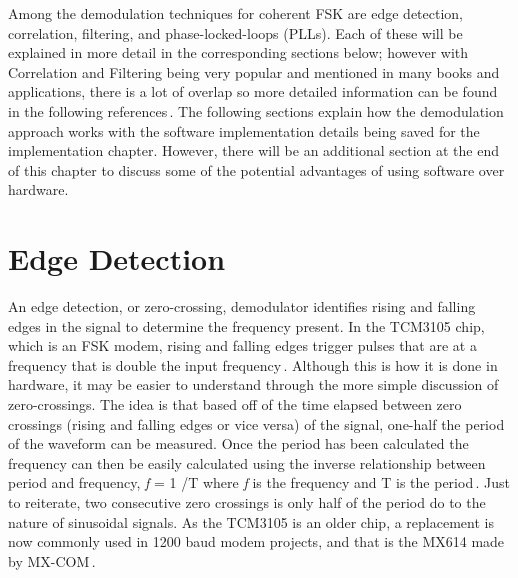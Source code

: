 Among the demodulation techniques for coherent FSK are edge detection, correlation, filtering, and phase-locked-loops (PLLs). Each of these will be explained in more detail in the corresponding sections below; however with Correlation and Filtering being very popular and mentioned in many books and applications, there is a lot of overlap so more detailed information can be found in the following references\,\cite{MarvinK.Simon1995,Sklar1988,J.Das1986,Proakis1983,Seguine2006,Semiconductor}. The following sections explain how the demodulation approach works with the software implementation details being saved for the implementation chapter. However, there will be an additional section at the end of this chapter to discuss some of the potential advantages of using software over hardware.

\section{Edge Detection}
An edge detection, or zero-crossing, demodulator identifies rising and falling edges in the signal to determine the frequency present. In the TCM3105 chip, which is an FSK modem, rising and falling edges trigger pulses that are at a frequency that is double the input frequency\,\cite{Instruments1994}. Although this is how it is done in hardware, it may be easier to understand through the more simple discussion of zero-crossings. The idea is that based off of the time elapsed between zero crossings (rising and falling edges or vice versa) of the signal, one-half the period of the waveform can be measured. Once the period has been calculated the frequency can then be easily calculated using the inverse relationship between period and frequency, \textit{f} = 1 /T where \textit{f} is the frequency and T is the period\,\cite{Seguine2006}. Just to reiterate, two consecutive zero crossings is only half of the period do to the nature of sinusoidal signals. As the TCM3105 is an older chip, a replacement is now commonly used in 1200 baud modem projects, and that is the MX614 made by MX-COM\,\cite{Mitrenga2000}.

